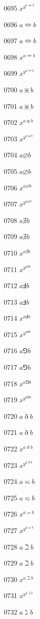 \documentclass{article}
\begin{document}
0695 $x^{y^{a\nLeftrightarrow b}}$\par
0696 $a\nleftrightarrow b$\par
0697 $\displaystyle a\nleftrightarrow b$\par
0698 $x^{a\nleftrightarrow b}$\par
0699 $x^{y^{a\nleftrightarrow b}}$\par
0700 $a\divideontimes b$\par
0701 $\displaystyle a\divideontimes b$\par
0702 $x^{a\divideontimes b}$\par
0703 $x^{y^{a\divideontimes b}}$\par
0704 $a\varnothing b$\par
0705 $\displaystyle a\varnothing b$\par
0706 $x^{a\varnothing b}$\par
0707 $x^{y^{a\varnothing b}}$\par
0708 $a\nexists b$\par
0709 $\displaystyle a\nexists b$\par
0710 $x^{a\nexists b}$\par
0711 $x^{y^{a\nexists b}}$\par
0712 $a\Finv b$\par
0713 $\displaystyle a\Finv b$\par
0714 $x^{a\Finv b}$\par
0715 $x^{y^{a\Finv b}}$\par
0716 $a\Game b$\par
0717 $\displaystyle a\Game b$\par
0718 $x^{a\Game b}$\par
0719 $x^{y^{a\Game b}}$\par
0720 $a\eth b$\par
0721 $\displaystyle a\eth b$\par
0722 $x^{a\eth b}$\par
0723 $x^{y^{a\eth b}}$\par
0724 $a\eqsim b$\par
0725 $\displaystyle a\eqsim b$\par
0726 $x^{a\eqsim b}$\par
0727 $x^{y^{a\eqsim b}}$\par
0728 $a\beth b$\par
0729 $\displaystyle a\beth b$\par
0730 $x^{a\beth b}$\par
0731 $x^{y^{a\beth b}}$\par
0732 $a\gimel b$\par
\end{document}
